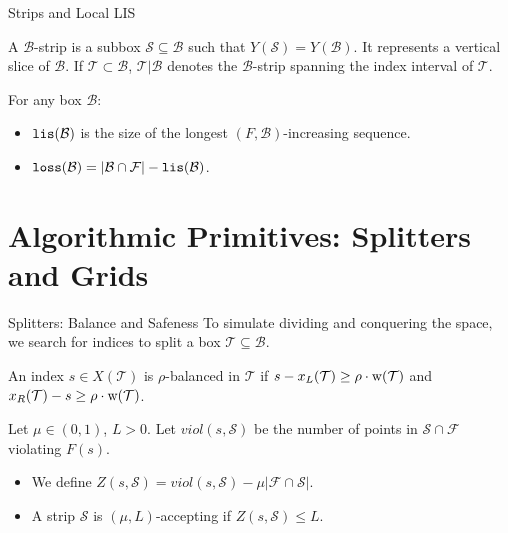 \documentclass[11pt,aspectratio=169]{beamer}
\newcommand{\lis}{{\tt lis}}
\newcommand{\loss}{{\tt loss}}
\newcommand{\width}{{\bf {\rm  w}}}
\begin{document}
\begin{frame}{Strips and Local LIS}
    \begin{definition}[Strips]
        A $\mathcal{B}$-strip is a subbox $\mathcal{S} \subseteq \mathcal{B}$ such that $Y(\mathcal{S}) = Y(\mathcal{B})$. It represents a vertical slice of $\mathcal{B}$. If $\mathcal{T} \subset \mathcal{B}$, $\mathcal{T}|\mathcal{B}$ denotes the $\mathcal{B}$-strip spanning the index interval of $\mathcal{T}$.
    \end{definition}
    
    \begin{definition}[Local \lis{} and \loss{}]
        For any box $\mathcal{B}$:
        \begin{itemize}
            \item $\lis(\mathcal{B})$ is the size of the longest $(F, \mathcal{B})$-increasing sequence.
            \item $\loss(\mathcal{B}) = |\mathcal{B} \cap \mathcal{F}| - \lis(\mathcal{B})$.
        \end{itemize}
    \end{definition}
\end{frame}

\section{Algorithmic Primitives: Splitters and Grids}

\begin{frame}{Splitters: Balance and Safeness}
    To simulate dividing and conquering the space, we search for indices to split a box $\mathcal{T} \subseteq \mathcal{B}$.
    
    \begin{definition}
        An index $s \in X(\mathcal{T})$ is $\rho$-balanced in $\mathcal{T}$ if $s - x_L(\mathcal{T}) \geq \rho \cdot \width(\mathcal{T})$ and $x_R(\mathcal{T}) - s \geq \rho \cdot \width(\mathcal{T})$.
    \end{definition}
    
    \begin{definition}
        Let $\mu \in (0,1)$, $L > 0$. Let $viol(s, \mathcal{S})$ be the number of points in $\mathcal{S} \cap \mathcal{F}$ violating $F(s)$. 
        \begin{itemize}
            \item We define $Z(s, \mathcal{S}) = viol(s, \mathcal{S}) - \mu |\mathcal{F} \cap \mathcal{S}|$.
            \item A strip $\mathcal{S}$ is $(\mu, L)$-accepting if $Z(s, \mathcal{S}) \leq L$.
        \end{itemize}
    \end{definition}
\end{frame}
\end{document}

